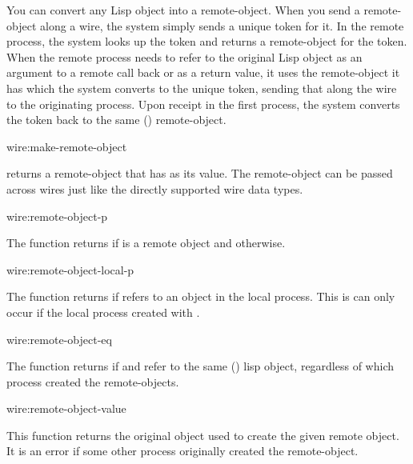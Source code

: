 You can convert any Lisp object into a remote-object.  When you send
a remote-object along a wire, the system simply sends a unique token
for it.  In the remote process, the system looks up the token and
returns a remote-object for the token.  When the remote process
needs to refer to the original Lisp object as an argument to a
remote call back or as a return value, it uses the remote-object it
has which the system converts to the unique token, sending that
along the wire to the originating process.  Upon receipt in the
first process, the system converts the token back to the same
() remote-object.

\begin{defun}{wire:}{make-remote-object}{}
  
   returns a remote-object that has
   as its value.  The remote-object can be passed across
  wires just like the directly supported wire data types.
\end{defun}

\begin{defun}{wire:}{remote-object-p}{}
  
  The function  returns \true{} if 
  is a remote object and \nil{} otherwise.
\end{defun}

\begin{defun}{wire:}{remote-object-local-p}{}
  
  The function  returns \true{} if
   refers to an object in the local process.  This is can
  only occur if the local process created  with
  .
\end{defun}

\begin{defun}{wire:}{remote-object-eq}{}
  
  The function  returns \true{} if  and
   refer to the same () lisp object, regardless of
  which process created the remote-objects.
\end{defun}

\begin{defun}{wire:}{remote-object-value}{}
  
  This function returns the original object used to create the given
  remote object.  It is an error if some other process originally
  created the remote-object.
\end{defun}

